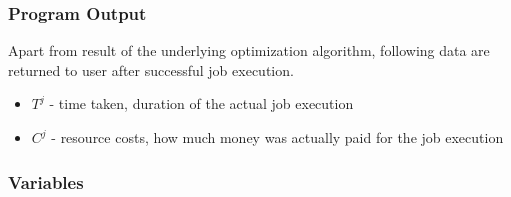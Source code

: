 \subsubsection{Program Output}
Apart from result of the underlying optimization algorithm,
following data are returned to user after successful job execution.

\begin{itemize}
	\item $T^{j}$ - time taken, duration of the actual job execution
	\item $C^{j}$ - resource costs, how much money was actually paid for the job execution
\end{itemize}

\subsubsection{Variables}

